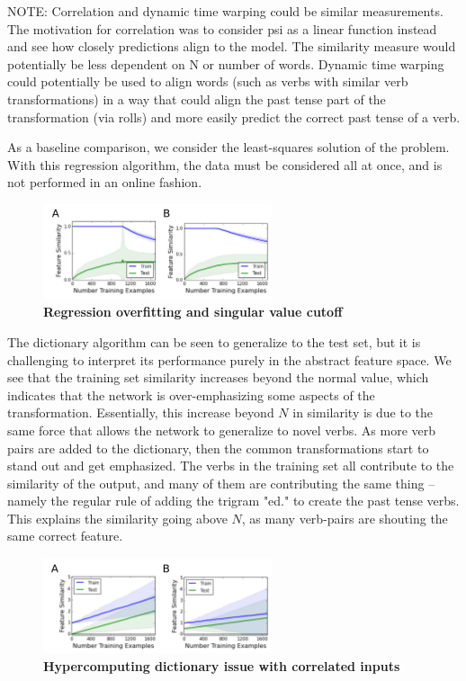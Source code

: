 \documentclass{article}
\begin{document}
NOTE: Correlation and dynamic time warping could be similar measurements. The motivation for correlation was to consider psi as a linear function instead and see how closely predictions align to the model. The similarity measure would potentially be less dependent on N or number of words. Dynamic time warping could potentially be used to align words (such as verbs with similar verb transformations) in a way that could align the past tense part of the transformation (via rolls) and more easily predict the correct past tense of a verb.

As a baseline comparison, we consider the least-squares solution of the problem. With this regression algorithm, the data must be considered all at once, and is not performed in an online fashion.

\begin{figure}
\centering
\includegraphics[width=0.6\textwidth]{regression_issue-170518.png}
\caption{\textbf{Regression overfitting and singular value cutoff}}
\end{figure}

The dictionary algorithm can be seen to generalize to the test set, but it is challenging to interpret its performance purely in the abstract feature space. We see that the training set similarity increases beyond the normal value, which indicates that the network is over-emphasizing some aspects of the transformation. Essentially, this increase beyond $N$ in similarity is due to the same force that allows the network to generalize to novel verbs. As more verb pairs are added to the dictionary, then the common transformations start to stand out and get emphasized. The verbs in the training set all contribute to the similarity of the output, and many of them are contributing the same thing -- namely the regular rule of adding the trigram "ed." to create the past tense verbs. This explains the similarity going above $N$, as many verb-pairs are shouting the same correct feature. 

\begin{figure}
\centering
\includegraphics[width=0.6\textwidth]{dictionary_issue-170518.png}
\caption{\textbf{Hypercomputing dictionary issue with correlated inputs}}
\end{figure}
\end{document}
